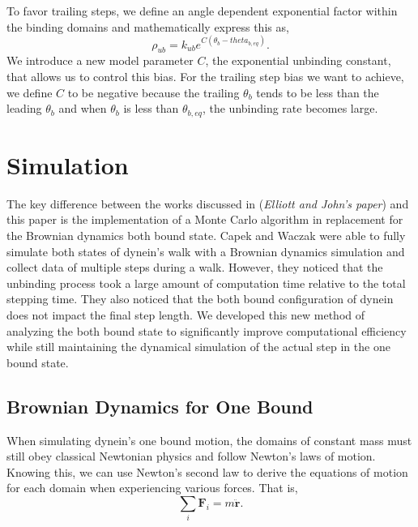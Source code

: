 To favor trailing steps, we define an angle dependent exponential factor within the binding domains and mathematically express this as,
\begin{equation}
	\rho_{ub}=k_{ub}e^{C(\theta_b-theta_{b,eq})}.
\end{equation}
We introduce a new model parameter $C$, the exponential unbinding constant, that allows us to control this bias. For the trailing step bias we want to achieve, we define $C$ to be negative because the trailing $\theta_b$ tends to be less than the leading $\theta_b$ and  when $\theta_b$ is less than $\theta_{b,eq}$, the unbinding rate becomes large.


\section{Simulation}

The key difference between the works discussed in \cite{Capek2017, } (\textit{Elliott and John's paper}) and this paper is the implementation of a Monte Carlo algorithm in replacement for the Brownian dynamics both bound state. Capek and Waczak were able to fully simulate both states of dynein's walk with a Brownian dynamics simulation and collect data of multiple steps during a walk. However, they noticed that the unbinding process took a large amount of computation time relative to the total stepping time. They also noticed that the both bound configuration of dynein does not impact the final step length. We developed this new method of analyzing the both bound state to significantly improve computational efficiency while still maintaining the dynamical simulation of the actual step in the one bound state. 



\subsection{Brownian Dynamics for One Bound}
\label{sec:BrownianDynamics}

When simulating dynein's one bound motion, the domains of constant mass must still obey classical Newtonian physics and follow Newton's laws of motion. Knowing this, we can use Newton's second law to derive the equations of motion for each domain when experiencing various forces. That is,
\begin{equation}
	\sum_{i}\textbf{F}_i=m\ddot{\textbf{r}}.
\end{equation} 

